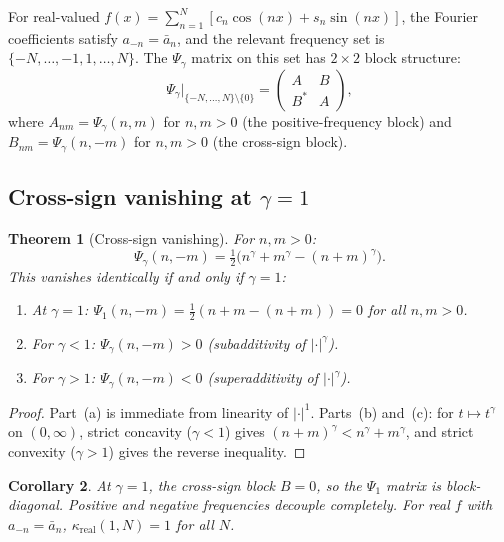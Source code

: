 \documentclass[11pt,a4paper]{article}
\theoremstyle{plain}
\newtheorem{theorem}{Theorem}[section]
\newtheorem{corollary}[theorem]{Corollary}
\theoremstyle{definition}
\theoremstyle{remark}
\begin{document}
For real-valued $f(x) = \sum_{n=1}^N [c_n\cos(nx) + s_n\sin(nx)]$,
the Fourier coefficients satisfy $a_{-n} = \bar{a}_n$, and the relevant
frequency set is $\{-N,\ldots,-1,1,\ldots,N\}$. The $\Psi_\gamma$ matrix
on this set has $2 \times 2$ block structure:
\begin{equation}\label{eq:block}
  \Psi_\gamma\Big|_{\{-N,\ldots,N\} \setminus \{0\}}
  = \begin{pmatrix} A & B \\ B^* & A \end{pmatrix},
\end{equation}
where $A_{nm} = \Psi_\gamma(n,m)$ for $n,m > 0$ (the positive-frequency
block) and $B_{nm} = \Psi_\gamma(n,-m)$ for $n,m > 0$ (the cross-sign
block).


\subsection{Cross-sign vanishing at $\gamma = 1$}\label{sec:cross-sign}

\begin{theorem}[Cross-sign vanishing]\label{thm:cross-sign}
For $n,m > 0$:
\begin{equation}\label{eq:cross-sign}
  \Psi_\gamma(n,-m) = \tfrac{1}{2}\bigl(n^\gamma + m^\gamma
  - (n+m)^\gamma\bigr).
\end{equation}
This vanishes identically if and only if $\gamma = 1$:
\begin{enumerate}[label=(\alph*)]
\item At $\gamma = 1$: $\Psi_1(n,-m)
  = \tfrac{1}{2}(n + m - (n+m)) = 0$ for all $n,m > 0$.
\item For $\gamma < 1$: $\Psi_\gamma(n,-m) > 0$
  (subadditivity of $|\cdot|^\gamma$).
\item For $\gamma > 1$: $\Psi_\gamma(n,-m) < 0$
  (superadditivity of $|\cdot|^\gamma$).
\end{enumerate}
\end{theorem}

\begin{proof}
Part~(a) is immediate from linearity of $|\cdot|^1$.
Parts~(b) and~(c): for $t \mapsto t^\gamma$ on $(0,\infty)$,
strict concavity ($\gamma < 1$) gives
$(n+m)^\gamma < n^\gamma + m^\gamma$, and strict convexity
($\gamma > 1$) gives the reverse inequality.
\end{proof}

\begin{corollary}\label{cor:block-diag}
At $\gamma = 1$, the cross-sign block $B = 0$, so the $\Psi_1$
matrix is block-diagonal. Positive and negative frequencies
decouple completely. For real $f$ with $a_{-n} = \bar{a}_n$,
$\kappa_{\mathrm{real}}(1,N) = 1$ for all $N$.
\end{corollary}
\end{document}
